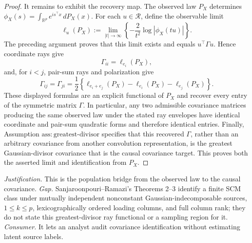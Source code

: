 \documentclass{article}
\begin{document}
\begin{proof}
It remains to exhibit the recovery map.  The observed law \(P_X\) determines \(\phi_X(s)=\int_{\mathbb R^p}e^{is^\top x}\,dP_X(x)\).  For each \(u\in\mathcal R\), define the observable limit
\[
\ell_u(P_X):=\lim_{|t|\to\infty}
\left\{-\frac{2}{t^2}\log|\phi_X(tu)|\right\}.
\]
The preceding argument proves that this limit exists and equals \(u^\top\Gamma u\).  Hence coordinate rays give
\[
\Gamma_{ii}=\ell_{e_i}(P_X),
\]
and, for \(i<j\), pair-sum rays and polarization give
\[
\Gamma_{ij}=\Gamma_{ji}
=\frac{1}{2}\left\{
\ell_{e_i+e_j}(P_X)-\ell_{e_i}(P_X)-\ell_{e_j}(P_X)
\right\}.
\]
These displayed formulas are an explicit functional of \(P_X\) and recover every entry of the symmetric matrix \(\Gamma\).  In particular, any two admissible covariance matrices producing the same observed law under the stated ray envelopes have identical coordinate and pair-sum quadratic forms and therefore identical entries.  Finally, Assumption \(\mathrm{ass{:}greatest\mbox{-}divisor}\) specifies that this recovered \(\Gamma\), rather than an arbitrary covariance from another convolution representation, is the greatest Gaussian-divisor covariance that is the causal covariance target.  This proves both the asserted limit and identification from \(P_X\).
\end{proof}
\par\smallskip\noindent \textit{Justification.} This is the population bridge from the observed law to the causal covariance. \textit{Gap.} Sanjaroonpouri--Ramazi's Theorems 2--3 identify a finite SCM class under mutually independent nonconstant Gaussian-indecomposable sources, \(1\le k\le p\), lexicographically ordered loading columns, and full column rank; they do not state this greatest-divisor ray functional or a sampling region for it. \textit{Consumer.} It lets an analyst audit covariance identification without estimating latent source labels.
\end{document}
